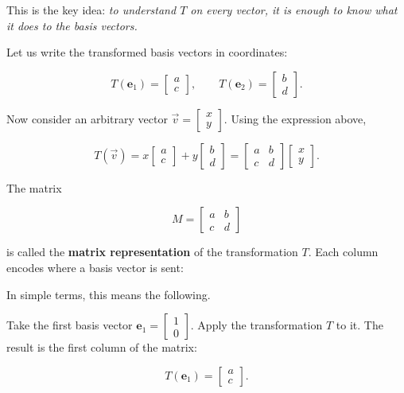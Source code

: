 \documentclass[11pt,openany]{book}
\theoremstyle{definition}
\begin{document}
This is the key idea: \textit{to understand $T$ on every vector, it is enough to know
what it does to the basis vectors.}

\medskip

Let us write the transformed basis vectors in coordinates:

\[
T(\mathbf{e}_1) = \begin{bmatrix} a \\ c \end{bmatrix},
\qquad
T(\mathbf{e}_2) = \begin{bmatrix} b \\ d \end{bmatrix}.
\]

Now consider an arbitrary vector $\vec{v} = \begin{bmatrix} x \\ y \end{bmatrix}$.
Using the expression above,

\[
T(\vec{v}) = x \begin{bmatrix} a \\ c \end{bmatrix} + y \begin{bmatrix} b \\ d \end{bmatrix}
=
\begin{bmatrix}
a & b \\
c & d
\end{bmatrix}
\begin{bmatrix}
x \\
y
\end{bmatrix}.
\]

The matrix

\[
M =
\begin{bmatrix}
a & b \\
c & d
\end{bmatrix}
\]

is called the \textbf{matrix representation} of the transformation $T$. Each column encodes
where a basis vector is sent:

In simple terms, this means the following.

\medskip

Take the first basis vector $\mathbf{e}_1 = \begin{bmatrix}1 \\ 0\end{bmatrix}$.
Apply the transformation $T$ to it. The result is the first column of the matrix:

\[
T(\mathbf{e}_1) = \begin{bmatrix} a \\ c \end{bmatrix}.
\]
\end{document}
